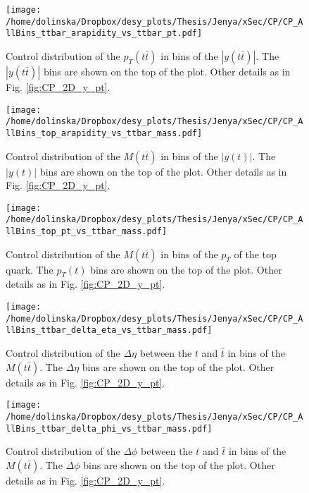 \begin{figure}[H]
  \centering
  \texttt{[image: /home/dolinska/Dropbox/desy\_plots/Thesis/Jenya/xSec/CP/CP\_AllBins\_ttbar\_arapidity\_vs\_ttbar\_pt.pdf]}
  \caption{Control distribution of the $p_{T}(t\bar{t})$ in bins of the $|y(t\bar{t})|$. The $|y(t\bar{t})|$ bins are shown on the top 
  of the plot. Other details as in Fig. \ref{fig:CP_2D_y_pt}.}
  \label{fig:CP_2D_pttt_ytt}
\end{figure}

\begin{figure}[H]
  \centering
  \texttt{[image: /home/dolinska/Dropbox/desy\_plots/Thesis/Jenya/xSec/CP/CP\_AllBins\_top\_arapidity\_vs\_ttbar\_mass.pdf]}
  \caption{Control distribution of the $M(t\bar{t})$ in bins of the $|y(t)|$. The $|y(t)|$ bins are shown on the top 
  of the plot. Other details as in Fig. \ref{fig:CP_2D_y_pt}.}
  \label{fig:CP_2D_Mtt_y}
\end{figure}

\begin{figure}[H]
  \centering
  \texttt{[image: /home/dolinska/Dropbox/desy\_plots/Thesis/Jenya/xSec/CP/CP\_AllBins\_top\_pt\_vs\_ttbar\_mass.pdf]}
  \caption{Control distribution of the $M(t\bar{t})$ in bins of the $p_{T}$ of the top quark. The $p_{T}(t)$ bins are shown on the top 
  of the plot. Other details as in Fig. \ref{fig:CP_2D_y_pt}.}
  \label{fig:CP_2D_Mtt_pt}
\end{figure}

\begin{figure}[H]
  \centering
  \texttt{[image: /home/dolinska/Dropbox/desy\_plots/Thesis/Jenya/xSec/CP/CP\_AllBins\_ttbar\_delta\_eta\_vs\_ttbar\_mass.pdf]}
  \caption{Control distribution of the $\Delta\eta$ between the $t$ and $\bar{t}$ in bins of the $M(t\bar{t})$. The $\Delta\eta$ bins are shown on the top 
  of the plot. Other details as in Fig. \ref{fig:CP_2D_y_pt}.}
  \label{fig:CP_2D_eta_Mtt}
\end{figure}

\begin{figure}[H]
  \centering
  \texttt{[image: /home/dolinska/Dropbox/desy\_plots/Thesis/Jenya/xSec/CP/CP\_AllBins\_ttbar\_delta\_phi\_vs\_ttbar\_mass.pdf]}
  \caption{Control distribution of the $\Delta\phi$ between the $t$ and $\bar{t}$ in bins of the $M(t\bar{t})$. The $\Delta\phi$ bins are shown on the top 
  of the plot. Other details as in Fig. \ref{fig:CP_2D_y_pt}.}
  \label{fig:CP_2D_phi_Mtt}
\end{figure}


